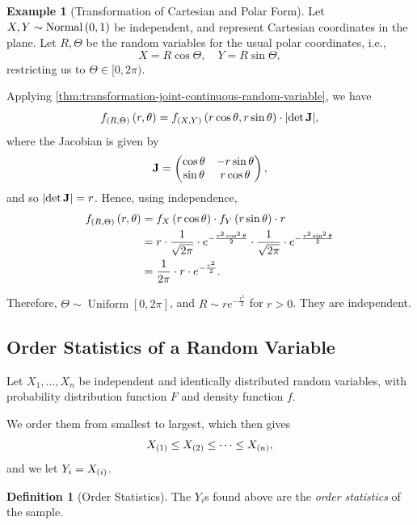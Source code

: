 \documentclass{article}
\theoremstyle{definition}
\newtheorem{definition}[theorem]{Definition}
\newtheorem{example}[theorem]{Example}
\theoremstyle{remark}
\DeclarePairedDelimiter{\abs}{\lvert}{\rvert}
\newcommand{\ccintv}[2]{[#1,#2]}
\newcommand{\cointv}[2]{[#1,#2)}
\newcommand{\pmqty}[1]{\begin{pmatrix}#1\end{pmatrix}}
\newcommand{\Uniform}{\operatorname{Uniform}}
\newcommand{\Normal}{\operatorname{Normal}}
\begin{document}
\begin{example}[Transformation of Cartesian and Polar Form]
    \label{ex:transformation-cartesian-polar}%
    Let \(X, Y \sim \Normal\pqty{0, 1}\) be independent, and represent Cartesian coordinates in the plane. Let \(R, \Theta\) be the random variables for the usual polar coordinates, i.e.,
    \[
        X = R \cos \Theta, \quad Y = R \sin \Theta,
    \]
    restricting us to \(\Theta \in \cointv{0}{2\pi}\).

    Applying \autoref{thm:transformation-joint-continuous-random-variable}, we have
    \[
        f_{\pqty{R, \Theta}} \pqty{r, \theta} = f_{\pqty{X, Y}} \pqty{r \cos \theta, r \sin \theta} \cdot \abs{\det \vb{J}},
    \]
    where the Jacobian is given by
    \[
        \vb{J} = \pmqty{
            \cos \theta & - r \sin \theta \\
            \sin \theta & r \cos \theta
        },
    \]
    and so \(\abs{\det \vb{J}} = r\). Hence, using independence,
    \begin{align*}
        f_{\left(R, \Theta\right)} \left(r, \theta\right) &= f_X \left(r \cos \theta\right) \cdot f_Y \left(r \sin \theta\right) \cdot r \\
        &= r \cdot \frac{1}{\sqrt{2\pi}} \cdot e^{- \frac{r^2 \cos^2 \theta}{2}} \cdot \frac{1}{\sqrt{2 \pi}} \cdot e^{- \frac{r^2 \sin^2 \theta}{2}} \\
        &= \frac{1}{2\pi} \cdot r \cdot e^{- \frac{r^2}{2}}.
    \end{align*}

    Therefore, \(\Theta \sim \Uniform\ccintv{0}{2\pi}\), and \(R \sim r e^{-\frac{r^2}{2}}\) for \(r > 0\). They are independent.
\end{example}

\subsection{Order Statistics of a Random Variable}

Let \(X_1, \ldots, X_n\) be independent and identically distributed random variables, with probability distribution function \(F\) and density function \(f\).

We order them from smallest to largest, which then gives
\[
    X_{\left(1\right)} \leq X_{\left(2\right)} \leq \cdots \leq X_{\left(n\right)},
\]
and we let \(Y_i = X_{\left(i\right)}\).

\begin{definition}[Order Statistics]
    \label{def:order-statistics}%
    The \(Y_i\)s found above are the \emph{order statistics} of the sample.
\end{definition}
\end{document}
